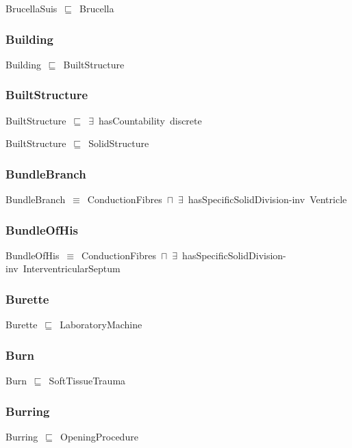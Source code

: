 \documentclass{article}
\begin{document}
BrucellaSuis~\ensuremath{\sqsubseteq}~Brucella~

\subsubsection*{Building}

Building~\ensuremath{\sqsubseteq}~BuiltStructure~

\subsubsection*{BuiltStructure}

BuiltStructure~\ensuremath{\sqsubseteq}~\ensuremath{\exists}~hasCountability~discrete~

BuiltStructure~\ensuremath{\sqsubseteq}~SolidStructure~

\subsubsection*{BundleBranch}

BundleBranch~\ensuremath{\equiv}~ConductionFibres~\ensuremath{\sqcap}~\ensuremath{\exists}~hasSpecificSolidDivision-inv~Ventricle

\subsubsection*{BundleOfHis}

BundleOfHis~\ensuremath{\equiv}~ConductionFibres~\ensuremath{\sqcap}~\ensuremath{\exists}~hasSpecificSolidDivision-inv~InterventricularSeptum

\subsubsection*{Burette}

Burette~\ensuremath{\sqsubseteq}~LaboratoryMachine~

\subsubsection*{Burn}

Burn~\ensuremath{\sqsubseteq}~SoftTissueTrauma~

\subsubsection*{Burring}

Burring~\ensuremath{\sqsubseteq}~OpeningProcedure~
\end{document}
